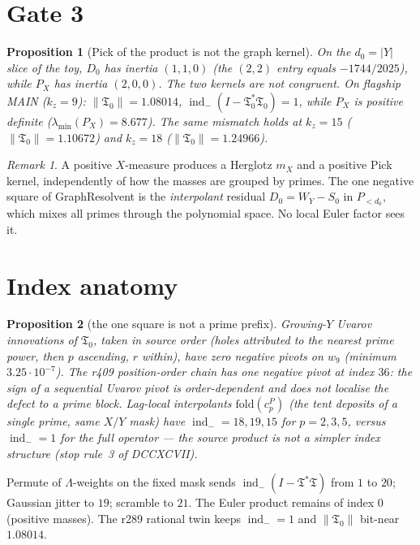 \documentclass[11pt]{article}
\newtheorem{prop}{Proposition}
\theoremstyle{remark}
\newtheorem{remark}{Remark}
\newcommand{\Tfrak}{\mathfrak{T}}
\newcommand{\indm}{\operatorname{ind}_{-}}
\begin{document}
\section{Gate 3}\label{sec:gate3}

\begin{prop}[Pick of the product is not the graph kernel]\label{prop:gate3}
On the $d_0=|Y|$ slice of the toy, $D_0$ has inertia
$(1,1,0)$ (the $(2,2)$ entry equals $-1744/2025$), while
$P_X$ has inertia $(2,0,0)$.
The two kernels are not congruent.
On flagship MAIN ($k_z=9$): $\|\Tfrak_0\|=1.08014$,
$\indm(I-\Tfrak_0^*\Tfrak_0)=1$, while $P_X$ is positive
definite ($\lambda_{\min}(P_X)=8.677$).
The same mismatch holds at $k_z=15$
($\|\Tfrak_0\|=1.10672$) and $k_z=18$
($\|\Tfrak_0\|=1.24966$).
\end{prop}

\begin{remark}
A positive $X$-measure produces a Herglotz $m_X$ and a
positive Pick kernel, independently of how the masses are
grouped by primes.
The one negative square of GraphResolvent is the
\emph{interpolant} residual $D_0=W_Y-S_0$ in $P_{<d_0}$,
which mixes all primes through the polynomial space.
No local Euler factor sees it.
\end{remark}

\section{Index anatomy}\label{sec:anatomy}

\begin{prop}[the one square is not a prime prefix]\label{prop:anatomy}
Growing-$Y$ Uvarov innovations of $\Tfrak_0$, taken in
source order (holes attributed to the nearest prime power,
then $p$ ascending, $r$ within), have \emph{zero} negative
pivots on $w_9$ (minimum $3.25\cdot 10^{-7}$).
The r409 position-order chain has one negative pivot at
index $36$: the sign of a sequential Uvarov pivot is
order-dependent and does not localise the defect to a
prime block.
Lag-local interpolants $\mathrm{fold}(c^{P}_p)$ (the
tent deposits of a single prime, same $X/Y$ mask) have
$\indm=18,19,15$ for $p=2,3,5$, versus $\indm=1$ for the
full operator --- the source product is \emph{not} a
simpler index structure (stop rule~3 of DCCXCVII).
\end{prop}

Permute of $\Lambda$-weights on the fixed mask sends
$\indm(I-\Tfrak^*\Tfrak)$ from $1$ to $20$; Gaussian
jitter to $19$; scramble to $21$.
The Euler product remains of index $0$ (positive masses).
The r289 rational twin keeps $\indm=1$ and
$\|\Tfrak_0\|$ bit-near $1.08014$.
\end{document}
